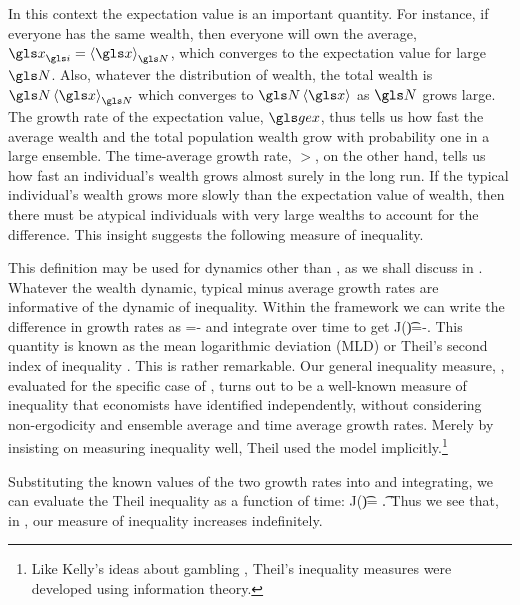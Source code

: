 In this context the expectation value is an important quantity. 
For instance, if everyone has the same wealth, then everyone will own the average, $\x_\gi=\ave{\x}_\N$, which converges to the expectation value for large $\N$. Also, whatever the distribution 
of wealth, the total wealth is $\N\ave{\x}_\N$ which converges to $\N\ave{\x}$ as $\N$ grows large. The growth 
rate of the expectation value, $\gex$, thus tells us how fast the average wealth and the 
total population wealth grow with probability one in a large ensemble. The time-average growth rate, $\gt$, on the other hand, tells us how fast an individual's wealth grows almost surely in 
the long run. If the typical individual's wealth grows more slowly than the 
expectation value of wealth, then there must be atypical individuals with very large 
wealths to account for the difference. This insight suggests the following measure of 
inequality.


This definition may be used for dynamics other than
\GBM, as we shall discuss in . Whatever the wealth dynamic, typical minus average growth rates are informative of the
dynamic of inequality. Within the \GBM framework we can write the difference in growth rates as 
\be
{}=\frac{\gd \ln \ave{\x}}{\gd\t}-\frac{\gd \ave{\ln \x}}{\gd\t}
\ee
and integrate over time to get
\be
J(\t)=\ln \ave{\x(\t)}-\ave{\ln \x(\t)}.
\ee
This quantity is known as the mean logarithmic deviation (MLD) or Theil's second index of inequality \cite{Theil1967}. 
This is rather remarkable. Our general inequality measure, , evaluated 
for the specific case of \GBM, turns out to be a well-known measure of inequality that 
economists have identified independently, without considering non-ergodicity and ensemble 
average and time average growth rates. Merely by insisting on measuring inequality well,
Theil used the \GBM model implicitly.\footnote{Like Kelly's ideas about gambling \cite{Kelly1956}, Theil's inequality measures were developed using information theory.}

Substituting the known values of the two growth rates into  and integrating, we can evaluate the Theil inequality as a function of time:
\be
J(\t)= \t.
\ee
Thus we see that, in \GBM, our measure of inequality increases indefinitely.

